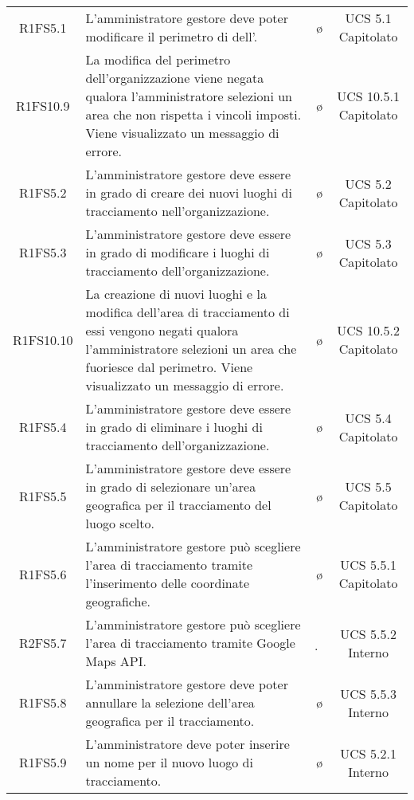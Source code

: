 {\begin{longtable}{ c C{6.5cm} c c}

R1FS5.1 & L'amministratore gestore deve poter modificare il perimetro di  dell'. & \o & UCS 5.1 Capitolato\\

R1FS10.9 & La modifica del perimetro dell'organizzazione viene negata qualora l'amministratore selezioni un area che non rispetta i vincoli imposti. Viene visualizzato un messaggio di errore. & \o & UCS 10.5.1 Capitolato \\

R1FS5.2 & L'amministratore gestore deve essere in grado di creare dei nuovi luoghi di tracciamento nell'organizzazione. & \o & UCS 5.2 Capitolato\\

R1FS5.3 & L'amministratore gestore deve essere in grado di modificare i luoghi di tracciamento dell'organizzazione. & \o & UCS 5.3 Capitolato\\

R1FS10.10 & La creazione di nuovi luoghi e la modifica dell'area di tracciamento di essi vengono negati qualora l'amministratore selezioni un area che fuoriesce dal perimetro. Viene visualizzato un messaggio di errore. & \o & UCS 10.5.2 Capitolato \\

R1FS5.4 & L'amministratore gestore deve essere in grado di eliminare i luoghi di tracciamento dell'organizzazione. & \o & UCS 5.4 Capitolato\\

R1FS5.5 & L'amministratore gestore deve essere in grado di selezionare un'area geografica per il tracciamento del luogo scelto. & \o & UCS 5.5 Capitolato\\

R1FS5.6 & L'amministratore gestore può scegliere l'area di tracciamento tramite l'inserimento delle coordinate geografiche. & \o & UCS 5.5.1 Capitolato\\

R2FS5.7 & L'amministratore gestore può scegliere l'area di tracciamento tramite Google Maps API. & \d & UCS 5.5.2 Interno\\

R1FS5.8 & L'amministratore gestore deve poter annullare la selezione dell'area geografica per il tracciamento. & \o & UCS 5.5.3 Interno\\

R1FS5.9 & L'amministratore deve poter inserire un nome per il nuovo luogo di tracciamento. & \o & UCS 5.2.1 Interno\\


\end{longtable}}
